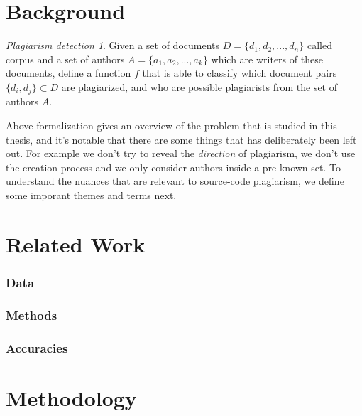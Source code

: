 \documentclass[english, grading]{tktltiki2}
\theoremstyle{definition}
\theoremstyle{remark}
\numberwithin{equation}{section} %
\begin{document}
\section{Background}

\newtheorem*{sc-plg}{Plagiarism detection}
\begin{sc-plg}
Given a set of documents $D = \{d_1, d_2, ..., d_n\}$ called corpus and a set of authors $A = \{a_1, a_2, ..., a_k\}$ which are writers of these documents, define a function $f$ that is able to classify which document pairs $\{d_i, d_j\} \subset D$ are plagiarized, and who are possible plagiarists from the set of authors $A$.
\end{sc-plg}

Above formalization gives an overview of the problem that is studied in this thesis, and it's notable that there are some things that has deliberately been left out. For example we don't try to reveal the \emph{direction} of plagiarism, we don't use the creation process and we only consider authors inside a pre-known set. To understand the nuances that are relevant to source-code plagiarism, we define some imporant themes and terms next.



\newpage

\section{Related Work}


\subsubsection{Data}


\subsubsection{Methods}


\subsubsection{Accuracies}




\section{Methodology}
\end{document}
